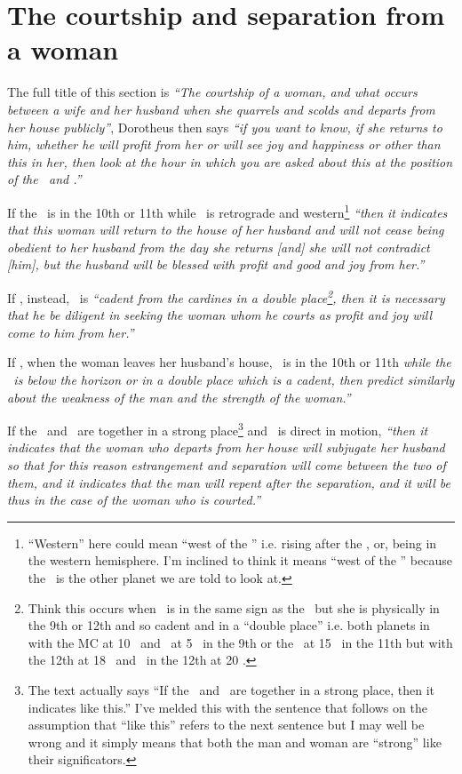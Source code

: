 \section{The courtship and separation from a woman}
The full title of this section is \textsl{``The courtship of a woman, and what occurs between a wife and her husband when she quarrels and scolds and departs from her house publicly''}, Dorotheus then says \textsl{``if you want to know, if she returns to him, whether he will profit from her or will see joy and happiness or other than this in her, then look at the hour in which you are asked about this at the position of the \Sun\, and \Venus.''}

If  the \Sun\, is in the 10th or 11th while \Venus\, is retrograde and western\footnote{``Western'' here could mean ``west of the \Sun'' i.e. rising after the \Sun, or, being in the western hemisphere. I'm inclined to think it means ``west of the \Sun'' because the \Sun\, is the other planet we are told to look at.} \textsl{``then it indicates that this woman will return to the house of her husband and will not cease being obedient to her husband from the day she returns [and] she will not contradict [him], but the husband will be blessed with profit and good and joy from her.''}

If , instead, \Venus\, is \textsl{``cadent from the cardines in a double place\footnote{Think this occurs when \Venus\, is in the same sign as the \Sun\, but she is physically in the 9th or 12th and so cadent and in a ``double place'' i.e. both planets in \Pisces\, with the MC at 10 \Pisces\, and \Venus\, at 5 \Pisces\, in the 9th or the \Sun\, at 15 \Pisces\, in the 11th but with the 12th at 18 \Pisces\, and \Venus\, in the 12th at 20 \Pisces.}, then it is necessary that he be diligent in seeking the woman whom he courts as profit and joy will come to him from her.''}

If , when the woman leaves her husband's house, \Venus\, is in the 10th or 11th \textsl{while the \Sun\, is below the horizon or in a double place which is a cadent, then predict similarly about the weakness of the man and the strength of the woman.''}

If  the \Sun\, and \Venus\, are together in a strong place\footnote{The text actually says ``If the \Sun\, and \Venus\, are together in a strong place, then it indicates like this.'' I've melded this with the sentence that follows on the assumption that ``like this'' refers to the next sentence but I may well be wrong and it simply means that both the man and woman are ``strong'' like their significators.} and \Venus\, is direct in motion, \textsl{``then it indicates that the woman who departs from her house will subjugate her husband so that for this reason estrangement and separation will come between the two of them, and it indicates that the man will repent after the separation, and it will be thus in the case of the woman who is courted.''}

